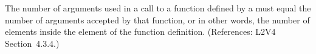 The number of arguments used in a call to a function defined by a
\FunctionDefinition must equal the number of arguments accepted by that
function, or in other words, the number of  elements inside the
 element of the function definition.  (References: L2V4
Section~4.3.4.)
